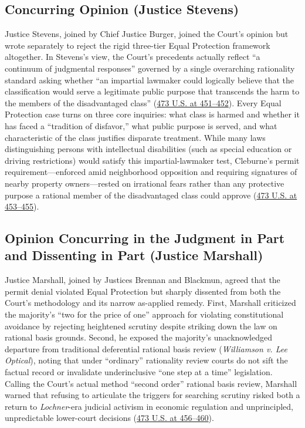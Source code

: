 \documentclass[12pt]{article}
\begin{document}
\subsection{Concurring Opinion (Justice Stevens)}

Justice Stevens, joined by Chief Justice Burger, joined the Court's opinion but wrote separately to reject the rigid three-tier Equal Protection framework altogether. In Stevens's view, the Court's precedents actually reflect ``a continuum of judgmental responses'' governed by a single overarching rationality standard asking whether ``an impartial lawmaker could logically believe that the classification would serve a legitimate public purpose that transcends the harm to the members of the disadvantaged class'' (\href{https://supreme.justia.com/cases/federal/us/473/432/}{473 U.S. at 451--452}). Every Equal Protection case turns on three core inquiries: what class is harmed and whether it has faced a ``tradition of disfavor,'' what public purpose is served, and what characteristic of the class justifies disparate treatment. While many laws distinguishing persons with intellectual disabilities (such as special education or driving restrictions) would satisfy this impartial-lawmaker test, Cleburne's permit requirement---enforced amid neighborhood opposition and requiring signatures of nearby property owners---rested on irrational fears rather than any protective purpose a rational member of the disadvantaged class could approve (\href{https://supreme.justia.com/cases/federal/us/473/432/}{473 U.S. at 453--455}).

\subsection{Opinion Concurring in the Judgment in Part and Dissenting in Part (Justice Marshall)}

Justice Marshall, joined by Justices Brennan and Blackmun, agreed that the permit denial violated Equal Protection but sharply dissented from both the Court's methodology and its narrow as-applied remedy. First, Marshall criticized the majority's ``two for the price of one'' approach for violating constitutional avoidance by rejecting heightened scrutiny despite striking down the law on rational basis grounds. Second, he exposed the majority's unacknowledged departure from traditional deferential rational basis review (\textit{Williamson v. Lee Optical}), noting that under ``ordinary'' rationality review courts do not sift the factual record or invalidate underinclusive ``one step at a time'' legislation. Calling the Court's actual method ``second order'' rational basis review, Marshall warned that refusing to articulate the triggers for searching scrutiny risked both a return to \textit{Lochner}-era judicial activism in economic regulation and unprincipled, unpredictable lower-court decisions (\href{https://supreme.justia.com/cases/federal/us/473/432/}{473 U.S. at 456--460}).
\end{document}
